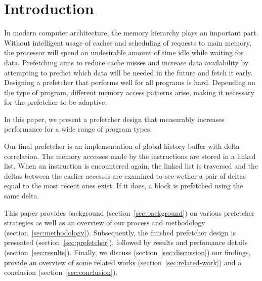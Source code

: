 \section{Introduction}
\label{sec:introduction}

In modern computer architecture, the memory hierarchy plays an important part.
Without intelligent usage of caches and scheduling of requests to main memory, the processor will spend an undesirable amount of time idle while waiting for data.
Prefetching aims to reduce cache misses and increase data availability by attempting to predict which data will be needed in the future and fetch it early. 
Designing a prefetcher that performs well for all programs is hard.
Depending on the type of program, different memory access patterns arise, making it necessary for the prefetcher to be adaptive.

In this paper, we present a prefetcher design that measurably increases performance for a wide range of program types.

Our final prefetcher is an implementation of global history buffer with delta correlation. The memory accesses made by the instructions are stored in a linked list.
When an instruction is encountered again, the linked list is traversed and the deltas between the earlier accesses are examined to see wether a pair of deltas equal to the most recent ones exist.
If it does, a block is prefetched using the same delta.

This paper provides background (section~\ref{sec:background}) on various prefetcher strategies as well as an overview of our process and methodology (section~\ref{sec:methodology}).
Subsequently, the finished prefetcher design is presented (section~\ref{sec:prefetcher}), followed by results and perfomance details (section~\ref{sec:results}).
Finally, we discuss (section~\ref{sec:discussion}) our findings, provide an overview of some related works (section~\ref{sec:related-work}) and a conclusion (section~\ref{sec:conclusion}).

